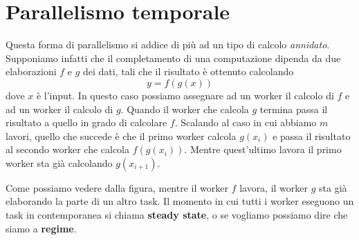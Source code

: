 \section{Parallelismo temporale}
Questa forma di parallelismo si addice di più ad un tipo di calcolo \emph{annidato}. Supponiamo
infatti che il completamento di una computazione dipenda da due elaborazioni $f$ e $g$ dei dati,
tali che il risultato è ottenuto calcolando
\[ y = f(g(x)) \]
dove $x$ è l'input. In questo caso possiamo assegnare ad un worker il calcolo di $f$ e ad un worker
il calcolo di $g$. Quando il worker che calcola $g$ termina passa il risultato a quello in grado di
calcolare $f$. Scalando al caso in cui abbiamo $m$ lavori, quello che succede è che il primo worker
calcola $g(x_i)$ e passa il risultato al secondo worker che calcola $f(g(x_i))$. Mentre quest'ultimo
lavora il primo worker sta già calcolando $g(x_{i+1})$.
\begin{center}
\end{center}
Come possiamo vedere dalla figura, mentre il worker $f$ lavora, il worker $g$ sta già elaborando
la parte di un altro task. Il momento in cui tutti i worker eseguono un task in contemporanea si
chiama \textbf{steady state}, o se vogliamo possiamo dire che siamo a \textbf{regime}.

